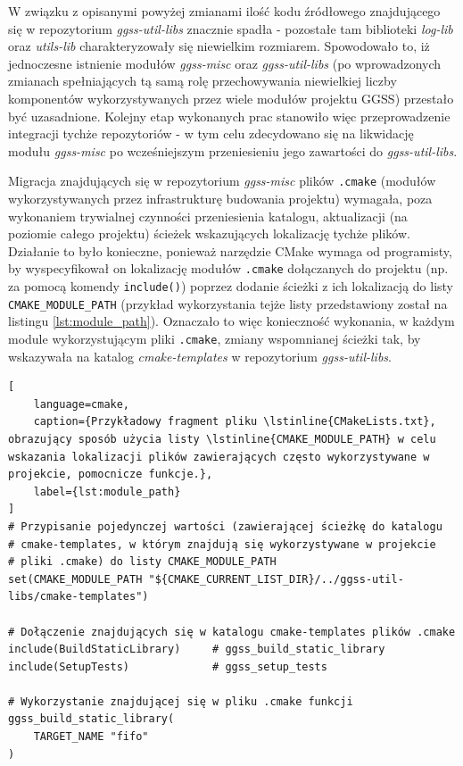 W związku z opisanymi powyżej zmianami ilość kodu źródłowego znajdującego się w repozytorium \emph{ggss-util-libs} znacznie spadła - pozostałe tam biblioteki \emph{log-lib} oraz \emph{utils-lib} charakteryzowały się niewielkim rozmiarem. Spowodowało to, iż jednoczesne istnienie modułów \emph{ggss-misc} oraz \emph{ggss-util-libs} (po wprowadzonych zmianach spełniających tą samą rolę przechowywania niewielkiej liczby komponentów wykorzystywanych przez wiele modułów projektu GGSS) przestało być uzasadnione. Kolejny etap wykonanych prac stanowiło więc przeprowadzenie integracji tychże repozytoriów - w tym celu zdecydowano się na likwidację modułu \emph{ggss-misc} po wcześniejszym przeniesieniu jego zawartości do \emph{ggss-util-libs}.

Migracja znajdujących się w repozytorium \emph{ggss-misc} plików \lstinline{.cmake} (modułów wykorzystywanych przez infrastrukturę budowania projektu) wymagała, poza wykonaniem trywialnej czynności przeniesienia katalogu, aktualizacji (na poziomie całego projektu) ścieżek wskazujących lokalizację tychże plików. Działanie to było konieczne, ponieważ narzędzie CMake wymaga od programisty, by wyspecyfikował on lokalizację modułów \lstinline{.cmake} dołączanych do projektu (np. za pomocą komendy \lstinline{include()}) poprzez dodanie ścieżki z ich lokalizacją do listy \lstinline{CMAKE_MODULE_PATH} (przykład wykorzystania tejże listy przedstawiony został na listingu \ref{lst:module_path}). Oznaczało to więc konieczność wykonania, w każdym module wykorzystującym pliki \lstinline{.cmake}, zmiany wspomnianej ścieżki tak, by wskazywała na katalog \emph{cmake-templates} w repozytorium \emph{ggss-util-libs}.

\begin{lstlisting}[
    language=cmake,
    caption={Przykładowy fragment pliku \lstinline{CMakeLists.txt}, obrazujący sposób użycia listy \lstinline{CMAKE_MODULE_PATH} w celu wskazania lokalizacji plików zawierających często wykorzystywane w projekcie, pomocnicze funkcje.},
    label={lst:module_path}
]
# Przypisanie pojedynczej wartości (zawierającej ścieżkę do katalogu
# cmake-templates, w którym znajdują się wykorzystywane w projekcie
# pliki .cmake) do listy CMAKE_MODULE_PATH
set(CMAKE_MODULE_PATH "${CMAKE_CURRENT_LIST_DIR}/../ggss-util-libs/cmake-templates")

# Dołączenie znajdujących się w katalogu cmake-templates plików .cmake
include(BuildStaticLibrary)     # ggss_build_static_library
include(SetupTests)             # ggss_setup_tests

# Wykorzystanie znajdującej się w pliku .cmake funkcji
ggss_build_static_library(
    TARGET_NAME "fifo"
)
\end{lstlisting}


